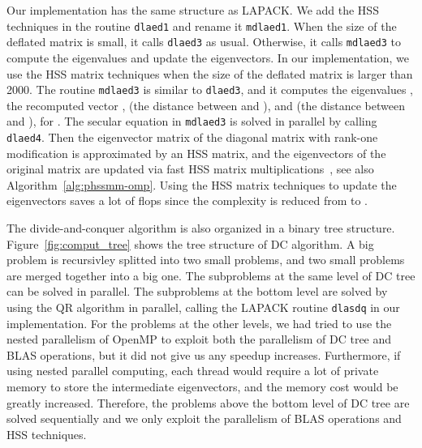 \documentclass[times]{nlaauth}
\newcounter{algorithm}
\begin{document}
Our implementation has the same structure as LAPACK.
We add the HSS techniques in the routine \texttt{dlaed1} and rename it \texttt{mdlaed1}.
When the size of the deflated matrix is small, it calls \texttt{dlaed3} as usual.
Otherwise, it calls \texttt{mdlaed3} to compute the eigenvalues and
update the eigenvectors.
In our implementation, we use the HSS matrix techniques when the size of the deflated matrix
is larger than 2000. The routine \texttt{mdlaed3} is similar to
\texttt{dlaed3}, and it computes the
eigenvalues , the recomputed vector ,
 (the distance between  and ),
and  (the distance between  and ), for .
The secular equation in \texttt{mdlaed3} is solved in parallel by calling \texttt{dlaed4}.
Then the eigenvector matrix of the diagonal matrix with rank-one modification is approximated
by an HSS matrix, and the eigenvectors of the original matrix  are updated via
fast HSS matrix multiplications~\cite{Lyons-thesis}, see also Algorithm~\ref{alg:phssmm-omp}.
Using the HSS matrix techniques to update the eigenvectors saves a lot of flops since
the complexity is reduced from  to .

The divide-and-conquer algorithm is also organized in a binary tree structure.
Figure~\ref{fig:comput_tree} shows the tree structure of DC algorithm.
A big problem is recursivley splitted into two small problems, and two small problems
are merged together into a big one.
The subproblems at the same level of DC tree can be solved
in parallel.
The subproblems at the bottom level are solved by using the QR algorithm in parallel, calling
the LAPACK routine \texttt{dlasdq} in our implementation.
For the problems at the other levels, we
had tried to use the nested parallelism of OpenMP to exploit both the parallelism of DC tree and
BLAS operations, but it did not give us any speedup increases.
Furthermore, if using nested parallel computing, each thread would require a lot of private memory to store the intermediate eigenvectors, and the
memory cost would be greatly increased.
Therefore, the problems above the bottom level of DC tree are solved sequentially and
we only exploit the parallelism of BLAS operations and HSS techniques.
\end{document}

